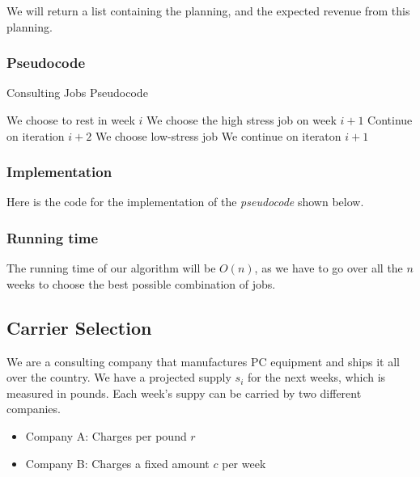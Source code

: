 \documentclass{article}
\begin{document}
We will return a list containing the planning, and the expected revenue from this planning.

\subsubsection*{Pseudocode}

\begin{algorithm}[H]
\caption{Consulting Jobs Pseudocode}
\begin{algorithmic}[1]
  \State We choose to rest in week $i$
  \State We choose the high stress job on week $i+1$
  \State Continue on iteration $i+2$
 \Else
  \State We choose low-stress job
  \State We continue on iteraton $i+1$
 \EndIf
\EndFor
\end{algorithmic}
\end{algorithm}

\subsubsection*{Implementation}

Here is the code for the implementation of the \textit{pseudocode} shown below.



\subsubsection*{Running time}

The running time of our algorithm will be $O(n)$, as we have to go over all the $n$ weeks to choose the best possible combination of jobs.


\subsection*{Carrier Selection}

We are a consulting company that manufactures PC equipment and ships it all over the country. We have a projected supply $s_i$ for the next weeks, which is measured in pounds. Each week's suppy can be carried by two different companies.

\begin{itemize}
 \item Company A: Charges per pound $r$
 \item Company B: Charges a fixed amount $c$ per week
\end{itemize}
\end{document}

